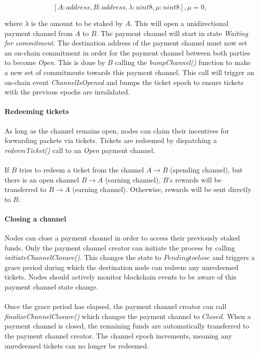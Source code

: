 $$[A: address, B: address, \lambda: uint8, \mu: uint8], \mu = 0,$$

where $\lambda$ is the amount to be staked by $A$. This will open a
unidirectional payment channel from $A$ to $B$. The payment channel will start
in state \textit{Waiting for commitment}. The destination address of the
payment channel must now set an on-chain commitment in order for the payment
channel between both parties to become \textit{Open}. This is done by $B$
calling the \textit{bumpChannel()} function to make a new set of commitments
towards this payment channel. This call will trigger an on-chain event
\textit{ChannelIsOpened} and bumps the ticket epoch to ensure tickets with the
previous epochs are invalidated.

\paragraph{Redeeming tickets}
As long as the channel remains open, nodes can claim their incentives for
forwarding packets via tickets. Tickets are redeemed by dispatching a
\textit{redeemTicket()} call to an \textit{Open} payment channel.
\\~\\If $B$ tries to redeem a ticket from the channel $A\rightarrow B$ (spending
channel), but there is an open channel $B\rightarrow A$ (earning channel),
$B$'s rewards will be transferred to $B\rightarrow A$ (earning channel).
Otherwise, rewards will be sent directly to $B$.

\paragraph{Closing a channel}
Nodes can close a payment channel in order to access their previously staked
funds. Only the payment channel creator can initiate the process by calling
\textit{initiateChannelClosure()}. This changes the state to $Pending to close$
and triggers a grace period during which the destination node can redeem
any unredeemed tickets. Nodes should actively monitor blockchain events to
be aware of this payment channel state change.
\\~\\Once the grace period has elapsed, the payment channel creator can call
\textit{finalizeChannelClosure()} which changes the payment channel to
$Closed$. When a payment channel is closed, the remaining funds are automatically transferred
to the payment channel creator. The channel epoch increments, meaning any unredeemed tickets can no longer be redeemed.

